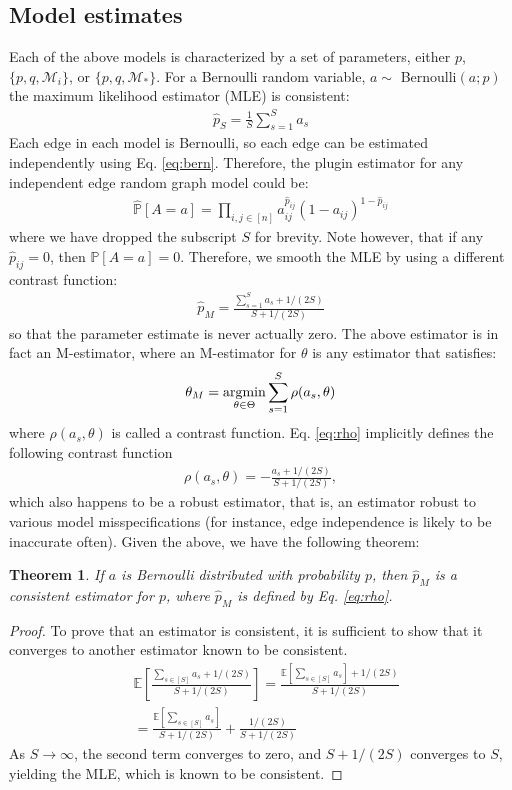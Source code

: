 \documentclass[10pt,journal,cspaper,compsoc]{IEEEtran}
\providecommand{\mc}[1]{\mathcal{#1}}
\providecommand{\mh}[1]{\hat{#1}}
\newcommand{\PP}{\mathbb{P}}
\newcommand{\EE}{\mathbb{E}}
\newcommand{\conv}{\rightarrow}
\newtheorem{thm}{Theorem}
\newcommand{\argmin}{\operatornamewithlimits{argmin}}
\newcommand{\thet}{\theta}
\newcommand{\Thet}{\Theta}
\begin{document}
\subsection{Model estimates} %
\label{sub:model_estimates}

Each of the above models is characterized by a set of parameters, either $p$, $\{p,q,\mc{M}_i\}$, or $\{p,q,\mc{M}_*\}$.  For a Bernoulli random variable, $a\sim$ Bernoulli$(a;p)$ the maximum likelihood estimator (MLE) is consistent:
\begin{align} \label{eq:bern}
	\mh{p}_S = \frac{1}{S} \sum_{s=1}^S a_s
\end{align}
Each edge in each model is Bernoulli, so each edge can be estimated independently using Eq. \eqref{eq:bern}.  Therefore, the plugin estimator for any independent edge random graph model could be:
\begin{align}
	\mh{\PP}[A=a]= \prod_{i,j\in [n]} a_{ij}^{\mh{p}_{ij}}(1-a_{ij})^{1-\mh{p}_{ij}}
\end{align}
where we have dropped the subscript $S$ for brevity.  Note however, that if any $\mh{p}_{ij}=0$, then $\PP[A=a]=0$.  Therefore, we smooth the MLE by using a different contrast function:
\begin{align} \label{eq:rho}
	\mh{p}_M = \frac{\sum_{s=1}^S a_s + 1/(2S)}{S+1/(2S)} 
\end{align}
so that the parameter estimate is never actually zero.  The above estimator is in fact an M-estimator, where an M-estimator for $\thet$ is any estimator that satisfies:
\begin{align}
	\thet_M = \argmin_{\thet \in \Thet} \sum_{s=1}^S \rho(a_s, \thet)
\end{align}
 where $\rho(a_s,\thet)$ is called a contrast function.  Eq. \eqref{eq:rho} implicitly defines the following contrast function
\begin{align}
\rho(a_s,\thet)=-\frac{a_s+1/(2S)}{S+1/(2S)},	
\end{align}
which also happens to be a robust estimator, that is, an estimator robust to various model misspecifications (for instance, edge independence is likely to be inaccurate often). Given the above, we have the following theorem:
\begin{thm}
If $a$ is Bernoulli distributed with probability $p$, then
$\mh{p}_M$ is a consistent estimator for $p$, where $\mh{p}_M$ is defined by Eq. \eqref{eq:rho}.
\end{thm}

\begin{proof}
To prove that an estimator is consistent, it is sufficient to show that it converges to another estimator known to be consistent.
\begin{align}
	&\EE\left[\frac{\sum_{s\in[S]} a_s+ 1/(2S)}{S + 1/(2S)}\right] = \frac{\EE[\sum_{s\in[S]} a_s] + 1/(2S)}{S + 1/(2S)} \nonumber\\&= \frac{\EE[\sum_{s\in[S]} a_s]}{S + 1/(2S)} + \frac{1/(2S)}{S + 1/(2S)} 
\end{align}
As $S\conv\infty$, the second term converges to zero, and $S+1/(2S)$ converges to $S$, yielding the MLE, which is known to be consistent.
\end{proof}
\end{document}
